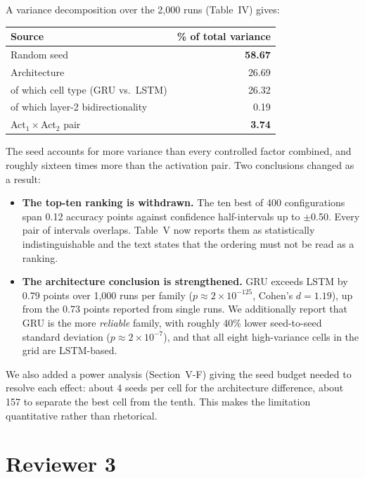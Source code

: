 \documentclass[10pt,a4paper]{article}
\newcommand{\pt}[1]{\textbf{#1}}
\begin{document}
A variance decomposition over the 2{,}000 runs (Table~IV) gives:

\begin{center}
\begin{tabular}{lr}
\toprule
Source & \% of total variance \\
\midrule
Random seed & \pt{58.67} \\
Architecture & 26.69 \\
\quad of which cell type (GRU vs.\ LSTM) & 26.32 \\
\quad of which layer-2 bidirectionality & 0.19 \\
Act$_1\times$Act$_2$ pair & \pt{3.74} \\
\bottomrule
\end{tabular}
\end{center}

The seed accounts for more variance than every controlled factor
combined, and roughly sixteen times more than the activation pair.
Two conclusions changed as a result:

\begin{itemize}[leftmargin=1.4em,itemsep=2pt]
  \item \pt{The top-ten ranking is withdrawn.} The ten best of 400
  configurations span 0.12 accuracy points against confidence
  half-intervals up to $\pm$0.50. Every pair of intervals overlaps.
  Table~V now reports them as statistically indistinguishable and
  the text states that the ordering must not be read as a ranking.

  \item \pt{The architecture conclusion is strengthened.} GRU
  exceeds LSTM by 0.79 points over 1{,}000 runs per family
  ($p\approx2\times10^{-125}$, Cohen's $d=1.19$), up from the 0.73
  points reported from single runs. We additionally report that GRU
  is the more \emph{reliable} family, with roughly 40\% lower
  seed-to-seed standard deviation ($p\approx2\times10^{-7}$), and
  that all eight high-variance cells in the grid are LSTM-based.
\end{itemize}

We also added a power analysis (Section~V-F) giving the seed budget
needed to resolve each effect: about 4 seeds per cell for the
architecture difference, about 157 to separate the best cell from
the tenth. This makes the limitation quantitative rather than
rhetorical.

\section*{Reviewer 3}
\end{document}
